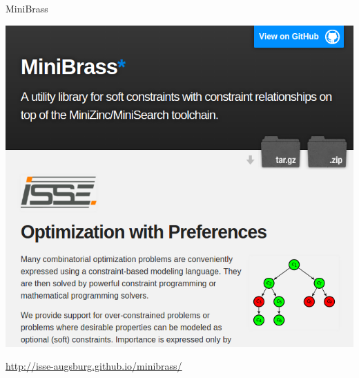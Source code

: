 \begin{frame}[fragile]{MiniBrass}

\begin{center}

\includegraphics[width=.5\textwidth]{img/minibrass.png}

\vspace*{2ex}

\url{http://isse-augsburg.github.io/minibrass/}

\end{center}

\end{frame}

